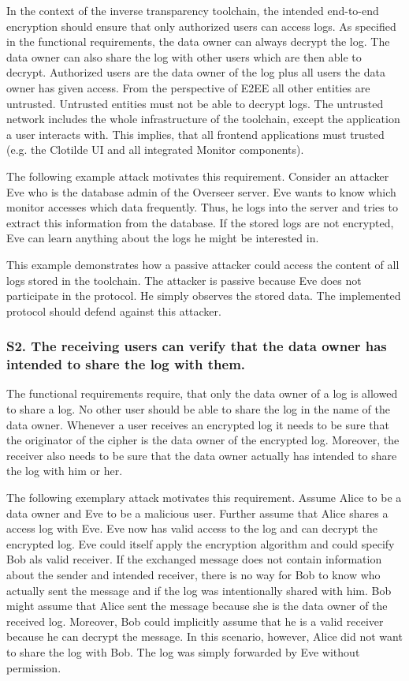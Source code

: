 \documentclass[../main.tex]{subfiles}
\begin{document}
In the context of the inverse transparency toolchain, the intended end-to-end encryption should ensure that only authorized users can access logs.
As specified in the functional requirements, the data owner can always decrypt the log.
The data owner can also share the log with other users which are then able to decrypt.
Authorized users are the data owner of the log plus all users the data owner has given access.
From the perspective of E2EE all other entities are untrusted.
Untrusted entities must not be able to decrypt logs.
The untrusted network includes the whole infrastructure of the toolchain, except the application a user interacts with.
This implies, that all frontend applications must trusted (e.g. the Clotilde UI and all integrated Monitor components).

The following example attack motivates this requirement.
Consider an attacker Eve who is the database admin of the Overseer server.
Eve wants to know which monitor accesses which data frequently.
Thus, he logs into the server and tries to extract this information from the database.
If the stored logs are not encrypted, Eve can learn anything about the logs he might be interested in.

This example demonstrates how a passive attacker could access the content of all logs stored in the toolchain.
The attacker is passive because Eve does not participate in the protocol.
He simply observes the stored data.
The implemented protocol should defend against this attacker.


\subsubsection{S2. The receiving users can verify that the data owner has intended to share the log with them.}

The functional requirements require, that only the data owner of a log is allowed to share a log.
No other user should be able to share the log in the name of the data owner.
Whenever a user receives an encrypted log it needs to be sure that the originator of the cipher is the data owner of the encrypted log.
Moreover, the receiver also needs to be sure that the data owner actually has intended to share the log with him or her.

The following exemplary attack motivates this requirement.
Assume Alice to be a data owner and Eve to be a malicious user.
Further assume that Alice shares a access log with Eve.
Eve now has valid access to the log and can decrypt the encrypted log.
Eve could itself apply the encryption algorithm and could specify Bob als valid receiver.
If the exchanged message does not contain information about the sender and intended receiver, there is no way for Bob to know who actually sent the message and if the log was intentionally shared with him.
Bob might assume that Alice sent the message because she is the data owner of the received log.
Moreover, Bob could implicitly assume that he is a valid receiver because he can decrypt the message.
In this scenario, however, Alice did not want to share the log with Bob.
The log was simply forwarded by Eve without permission.
\end{document}
